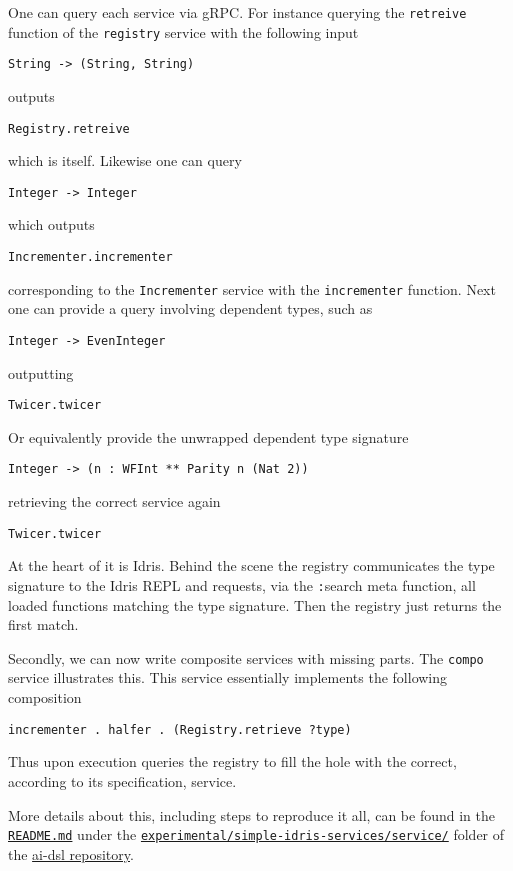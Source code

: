 \documentclass[]{report}
\begin{document}
One can query each service via gRPC.  For instance querying the
\texttt{retreive} function of the \texttt{registry} service with the
following input
\begin{verbatim}
String -> (String, String)
\end{verbatim}
outputs
\begin{verbatim}
Registry.retreive
\end{verbatim}
which is itself.  Likewise one can query
\begin{verbatim}
Integer -> Integer
\end{verbatim}
which outputs
\begin{verbatim}
Incrementer.incrementer
\end{verbatim}
corresponding to the \texttt{Incrementer} service with the
\texttt{incrementer} function.
Next one can provide a query involving dependent types, such as
\begin{verbatim}
Integer -> EvenInteger
\end{verbatim}
outputting
\begin{verbatim}
Twicer.twicer
\end{verbatim}
Or equivalently provide the unwrapped dependent type signature
\begin{verbatim}
Integer -> (n : WFInt ** Parity n (Nat 2))
\end{verbatim}
retrieving the correct service again
\begin{verbatim}
Twicer.twicer
\end{verbatim}

At the heart of it is Idris.  Behind the scene the registry
communicates the type signature to the Idris REPL and requests, via
the {\texttt :search} meta function, all loaded functions matching the
type signature.  Then the registry just returns the first match.

Secondly, we can now write composite services with missing parts.  The
\texttt{compo} service illustrates this.  This service essentially
implements the following composition
\begin{verbatim}
incrementer . halfer . (Registry.retrieve ?type)
\end{verbatim}
Thus upon execution queries the registry to fill the hole with the
correct, according to its specification, service.

More details about this, including steps to reproduce it all, can be
found in the
\href{https://github.com/singnet/ai-dsl/blob/master/experimental/registry-dsl/README.md}{\texttt{README.md}}
under the
\href{https://github.com/singnet/ai-dsl/blob/master/experimental/registry-dsl/}{\texttt{experimental/simple-idris-services/service/}}
folder of the \href{https://github.com/singnet/ai-dsl/}{ai-dsl
  repository}.
\end{document}
